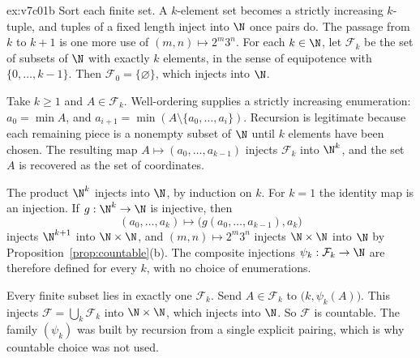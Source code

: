 \begin{solution}{ex:v7c01b}
\idea Sort each finite set. A $k$-element set becomes a strictly increasing $k$-tuple, and tuples of a fixed length inject into $\N$ once pairs do. The passage from $k$ to $k+1$ is one more use of $(m,n)\mapsto 2^m 3^n$.
\writeup For each $k\in\N$, let $\mathcal F_k$ be the set of subsets of $\N$ with exactly $k$ elements, in the sense of equipotence with $\{0,\ldots,k-1\}$. Then $\mathcal F_0=\{\varnothing\}$, which injects into $\N$.

Take $k\ge 1$ and $A\in\mathcal F_k$. Well-ordering supplies a strictly increasing enumeration: $a_0=\min A$, and $a_{i+1}=\min(A\setminus\{a_0,\ldots,a_i\})$. Recursion is legitimate because each remaining piece is a nonempty subset of $\N$ until $k$ elements have been chosen. The resulting map $A\mapsto(a_0,\ldots,a_{k-1})$ injects $\mathcal F_k$ into $\N^k$, and the set $A$ is recovered as the set of coordinates.

The product $\N^k$ injects into $\N$, by induction on $k$. For $k=1$ the identity map is an injection. If $g:\N^k\to\N$ is injective, then
\[
(a_0,\ldots,a_k)\mapsto\bigl(g(a_0,\ldots,a_{k-1}),a_k\bigr)
\]
injects $\N^{k+1}$ into $\N\times\N$, and $(m,n)\mapsto 2^m 3^n$ injects $\N\times\N$ into $\N$ by Proposition~\ref{prop:countable}(b). The composite injections $\psi_k:\mathcal F_k\to\N$ are therefore defined for every $k$, with no choice of enumerations.

Every finite subset lies in exactly one $\mathcal F_k$. Send $A\in\mathcal F_k$ to $\bigl(k,\psi_k(A)\bigr)$. This injects $\mathcal F=\bigcup_k\mathcal F_k$ into $\N\times\N$, which injects into $\N$. So $\mathcal F$ is countable. The family $(\psi_k)$ was built by recursion from a single explicit pairing, which is why countable choice was not used.
\end{solution}

